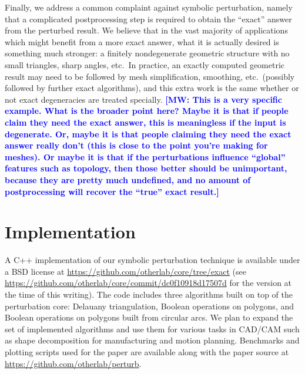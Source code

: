 \documentclass[11pt]{article}
\newcommand{\MW}[1]{\textcolor{blue}{\bf[MW: #1]}}
\begin{document}
Finally, we address a common complaint against symbolic perturbation, namely that a complicated postprocessing step is required to obtain the ``exact'' answer from the
perturbed result.  We believe that in the vast majority of applications which might benefit from a more exact answer, what it is actually desired is something much
stronger: a finitely nondegenerate geometric structure with no small triangles, sharp angles, etc.\  In practice, an exactly computed geometric result may need to
be followed by mesh simplification, smoothing, etc.\ (possibly followed by further exact algorithms), and this extra work is the same whether or not exact degeneracies are
treated specially. \MW{This is a very specific example. What is the broader point here? Maybe it is that if people claim they need the exact answer, this is meaningless if the input is degenerate. Or, maybe it is that people claiming they need the exact answer really don't (this is close to the point you're making for meshes). Or maybe it is that if the perturbations influence ``global'' features such as topology, then those better should be unimportant, because they are pretty much undefined, and no amount of postprocessing will recover the ``true'' exact result.}

\section{Implementation}

A C++ implementation of our symbolic perturbation technique is available under a BSD license at \url{https://github.com/otherlab/core/tree/exact} (see 
\url{https://github.com/otherlab/core/commit/dc0f10918d17507d} for the version at the time of this writing).  The code includes three algorithms built on top of the perturbation
core: Delauany triangulation, Boolean operations on polygons, and Boolean operations on polygons built from circular arcs.  We plan to expand the set of implemented algorithms
and use them for various tasks in CAD/CAM such as shape decomposition for manufacturing and motion planning.  Benchmarks and plotting scripts used for the
paper are available along with the paper source at \url{https://github.com/otherlab/perturb}.
\end{document}
